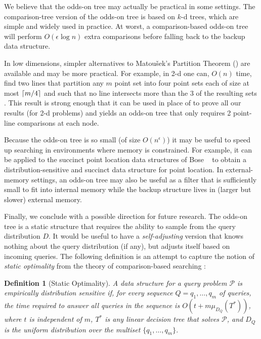\documentclass{patmorin}
\newtheorem{defn}{Definition}
\begin{document}
We believe that the odds-on tree may actually be practical in some
settings.  The comparison-tree version of the odds-on tree is based on
$k$-d trees, which are simple and widely used in practice. At worst,
a comparison-based odds-on tree will perform $O(\epsilon\log n)$ extra
comparisons before falling back to the backup data structure.

In low dimensions, simpler alternatives to Matou\v{s}ek's Partition
Theorem () are available and may be more
practical.  For example, in 2-d one can, $O(n)$ time, find two lines
that partition any $m$ point set into four point sets each of size at
most ${\lceil m/4 \rceil}$ and such that no line intersects more than the 3 of
the resulting sets \cite{m85}. This result is strong enough that it can
be used in place of  to prove all our results
(for 2-d problems) and yields an odds-on tree that only requires 2
point-line comparisons at each node.

Because the odds-on tree is so small (of size $O(n^\epsilon)$) it
may be useful to speed up searching in environments where memory is
constrained. For example, it can be applied to the succinct point
location data structures of Bose \etal\ \cite{bchmm09} to obtain a
distribution-sensitive and succinct data structure for point location.
In external-memory settings, an odds-on tree may also be useful as a
filter that is sufficiently small to fit into internal memory while the
backup structure lives in (larger but slower) external memory.

Finally, we conclude with a possible direction for future research.  The
odds-on tree is a static structure that requires the ability to sample from
the query distribution $D$.  It would be useful to have a \emph{self-adjusting}
version that knows nothing about the query distribution (if any), but
adjusts itself based on incoming queries.   The following definition
is an attempt to capture the notion of \emph{static optimality} from the theory
of comparison-based searching \cite{st85}:

\begin{defn}[Static Optimality]\label{defn:static-optimality}
A data structure for a query problem $\mathcal{P}$ is \emph{empirically
distribution sensitive} if, for every sequence $Q=q_1,\ldots,q_m$
of queries, the time required to answer all queries in the sequence
is $O(t + m\mu_{D_Q}(T^*))$, where $t$ is independent of $m$, $T^*$
is any linear decision tree that solves $\mathcal{P}$, and $D_{Q}$
is the uniform distribution over the multiset $\{q_1,\ldots,q_m\}$.
\end{defn}
\end{document}
